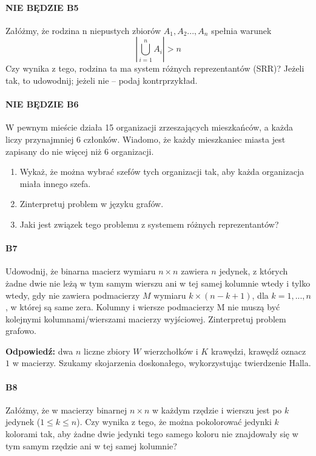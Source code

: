 \documentclass[a4paper,12pt]{article}
\theoremstyle{definition}%
\theoremstyle{definition}
\theoremstyle{problem}
\begin{document}
\paragraph{NIE BĘDZIE B5} Załóżmy, że rodzina n niepustych zbiorów $A_1, A_2 . . . , A_n$ spełnia warunek
$$|\bigcup _{i=1}^n A_i|>n$$
Czy wynika z tego, rodzina ta ma system różnych reprezentantów (SRR)? Jeżeli tak, to udowodnij; jeżeli nie – podaj kontrprzykład.

\paragraph{NIE BĘDZIE B6} W pewnym mieście działa 15 organizacji zrzeszających mieszkańców, a każda liczy przynajmniej 6 członków. Wiadomo, że każdy mieszkaniec miasta jest zapisany do nie więcej niż 6 organizacji.
\begin{enumerate}[label=\alph*)]
\item Wykaż, że można wybrać szefów tych organizacji tak, aby każda organizacja miała innego szefa.
\item Zinterpretuj problem w języku grafów.
\item Jaki jest związek tego problemu z systemem różnych reprezentantów?
\end{enumerate}

\paragraph{B7} Udowodnij, że binarna macierz wymiaru $n\times n$ zawiera $n$ jedynek, z których żadne dwie nie leżą w tym samym wierszu ani w tej samej kolumnie wtedy i tylko wtedy, gdy nie zawiera podmacierzy $M$ wymiaru $k \times (n - k + 1)$, dla $k = 1, . . . , n$, w której są same zera. Kolumny i wiersze podmacierzy M nie muszą być kolejnymi kolumnami/wierszami macierzy wyjściowej. Zinterpretuj problem grafowo.

\textbf{Odpowiedź: } dwa $n$ liczne zbiory $W$ wierzchołków i $K$ krawędzi, krawędź oznacz $1$ w macierzy. Szukamy skojarzenia doskonałego, wykorzystując twierdzenie Halla.
\paragraph{B8} Załóżmy, że w macierzy binarnej $n\times n$ w każdym rzędzie i wierszu jest po $k$ jedynek ($1 \leq k \leq n$). Czy wynika z tego, że można pokolorować jedynki $k$ kolorami tak, aby żadne dwie jedynki tego samego koloru nie znajdowały się w tym samym rzędzie ani w tej samej kolumnie?
\end{document}
